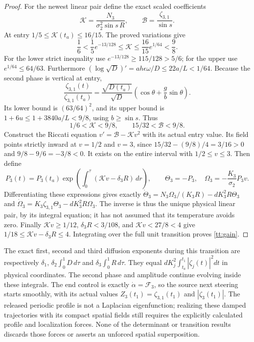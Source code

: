 \begin{proof}
For the newest linear pair define the exact scaled coefficients
\[
 \mathcal K=\frac{N_3}{\sigma_2^2\sin s\,R},\qquad
 \mathcal B=\frac{\zeta_{3,1}}{\sin s}.
\]
At entry $1/5\leq\mathcal K(t_a)\leq16/15$.
The proved variations give
\[
 \frac16<\frac15e^{-13/128}\leq\mathcal K
 \leq\frac{16}{15}e^{1/64}<\frac98.
\]
For the lower strict inequality use $e^{-13/128}\geq115/128>5/6$;
for the upper use $e^{1/64}\leq64/63$.
Furthermore $(\log\sqrt D)'=ah\epsilon\omega/D\leq22a/L<1/64$.
Because the second phase is vertical at entry,
\[
 \frac{\zeta_{3,1}(t)}{\zeta_{3,1}(t_a)}
 =\frac{\sqrt{D(t_a)}}{\sqrt D}
        \left(\cos\theta+\frac gb\sin\theta\right).
\]
Its lower bound is $(63/64)^2$, and its upper bound is
$1+6u\leq1+3840a/L<9/8$, using $b\geq\sin s$.
Thus
\begin{equation}\label{tt:newestcoefficientbox}
 1/6<\mathcal K<9/8,\qquad 15/32<\mathcal B<9/8.
\end{equation}
Construct the Riccati equation $v'=\mathcal B-\mathcal K v^2$
with its actual entry value. Its field points strictly inward at
$v=1/2$ and $v=3$, since
$15/32-(9/8)/4=3/16>0$ and $9/8-9/6=-3/8<0$.
It exists on the entire interval with $1/2\leq v\leq3$.
Then define
\begin{equation}\label{tt:amplitudeinverse}
 P_3(t)=P_3(t_a)
 \exp\!\left(\int_0^\tau(\mathcal K v-\delta_3R)\,dr\right),
 \qquad \Theta_3=-P_3,\quad
 \Omega_3=-\frac{K_3}{\sigma_2}P_3v.
\end{equation}
Differentiating these expressions gives exactly
$\dot\Theta_3=N_3\Omega_3/(K_3R)-dK_3^2R\Theta_3$
and $\dot\Omega_3=K_3\zeta_{3,1}\Theta_3-dK_3^2R\Omega_3$.
The inverse is thus the unique physical linear pair, by its integral
equation; it has not assumed that its temperature avoids zero.
Finally $\mathcal K v\geq1/12$, $\delta_3R<3/108$, and
$\mathcal K v<27/8<4$ give
$1/18\leq\mathcal K v-\delta_3R\leq4$.
Integrating over the full unit transition proves \eqref{tt:gain}.
\end{proof}

The exact first, second and third diffusion exponents during this
transition are respectively $\delta_1$, $\delta_2\int_0^1D\,d\tau$
and $\delta_3\int_0^1R\,d\tau$. They equal
$dK_j^2\int_{t_a}^{t_1}|\zeta_j(t)|^2dt$ in physical coordinates.
The second phase and amplitude continue evolving inside these
integrals. The end control is exactly $\dot\alpha=\mathcal F_3$,
so the source next steering starts smoothly, with its actual values
$Z_3(t_1)=\zeta_{3,1}(t_1)$ and $|\zeta_3(t_1)|$.
The released periodic profile is not a Laplacian eigenfunction;
realizing these damped trajectories with its compact spatial fields
still requires the explicitly calculated profile and localization
forces. None of the determinant or transition results discards those
forces or asserts an unforced spatial superposition.
